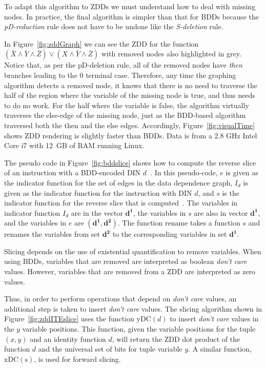 {To adapt this algorithm to ZDDs we must understand how to deal with missing nodes.  In practice, the final algorithm is simpler than that for BDDs because the \textit{pD-reduction} rule does not have to be undone like the \textit{S-deletion} rule.

In Figure~\ref{fig:zddGraph} we can see the ZDD for the function $(\bar{X}\land\bar{Y}\land\bar{Z})\lor(X\land\bar{Y}\land\bar{Z})$ with removed nodes also highlighted in grey.  Notice that, as per the pD-deletion rule, all of the removed nodes have \textit{then} branches leading to the $0$ terminal case. Therefore, any time the graphing algorithm detects a removed node, it knows that there is no need to traverse the half of the region where the variable of the missing node is true, and thus needs to do no work.  For the half where the variable is false, the algorithm virtually traverses the else-edge of the missing node, just as the BDD-based algorithm traversed both the then and the else edges. Accordingly, Figure~\ref{fig:visualTime} shows ZDD rendering is slightly faster than BDDs.  Data is from a 2.8 GHz Intel Core i7 with 12~GB of RAM running Linux.


The pseudo code in Figure~\ref{fig:bddslice} shows how to compute the reverse slice of an instruction with a BDD-encoded DIN $d$~\cite{price:06:cal}.  In this pseudo-code, $e$ is given as the indicator function for the set of edges in the data dependence graph, $I_d$ is given as the indicator function for the instruction with DIN $d$, and $s$ is the indicator function for the reverse slice that is computed~\cite{price:06:cal}.  The variables in indicator function $I_d$ are in the vector $\mathbf{d^1}$, the variables in $s$ are also in vector $\mathbf{d^1}$, and the variables in $e$ are $(\mathbf{d^1},\mathbf{d^2})$.  The function $\mathrm{rename}$ takes a function $s$ and renames the variables from set $\mathbf{d^2}$ to the corresponding variables in set $\mathbf{d^1}$.

Slicing depends on the use of existential quantification to remove variables.  When using BDDs, variables that are removed are interpreted as boolean \textit{don't care} values.  However, variables that are removed from a ZDD are interpreted as zero values.

Thus, in order to perform operations that depend on \textit{don't care} values, an additional step is taken to insert \textit{don't care} values.  The slicing algorithm shown in Figure~\ref{fig:zddITEslice} uses the function $\mathrm{yDC}(d)$ to insert \textit{don't care} values in the $y$ variable positions.  This function, given the variable positions for the tuple $(x,y)$ and an identity function $d$, will return the ZDD dot product\cite{mishchenko:01:sc} of the function $d$ and the universal set of bits for tuple variable $y$.  A similar function, $\mathrm{xDC(s)}$, is used for forward slicing.

}
